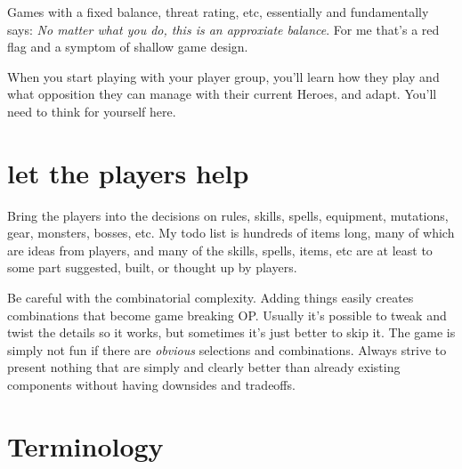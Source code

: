 Games with a fixed balance, threat rating, etc, essentially and fundamentally says: \emph{No matter what you do, this is an approxiate balance}. For me that's a red flag and a symptom of shallow game design.

When you start playing with your player group, you'll learn how they play and what opposition they can manage with their current Heroes, and adapt. You'll need to think for yourself here.


\section*{let the players help}
Bring the players into the decisions on rules, skills, spells, equipment, mutations, gear, monsters, bosses, etc. My todo list is hundreds of items long, many of which are ideas from players, and many of the skills, spells, items, etc are at least to some part suggested, built, or thought up by players.

Be careful with the combinatorial complexity. Adding things easily creates combinations that become game breaking OP. Usually it's possible to tweak and twist the details so it works, but sometimes it's just better to skip it. The game is simply not fun if there are \emph{obvious} selections and combinations. Always strive to present nothing that are simply and clearly better than already existing components without having downsides and tradeoffs.







\section*{Terminology}

